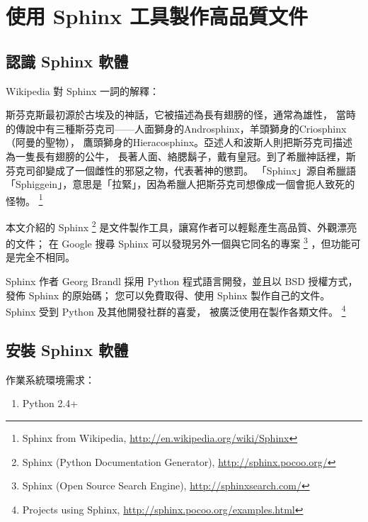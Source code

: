 \documentclass[a4paper,12pt,english]{sphinxmanual}
\begin{document}
\chapter{使用 Sphinx 工具製作高品質文件}
\label{sphinx:sphinx}\label{sphinx::doc}

\section{認識 Sphinx 軟體}
\label{sphinx_intro:sphinx}\label{sphinx_intro::doc}
Wikipedia 對 Sphinx 一詞的解釋：

\begin{DUlineblock}{0em}
\item[] 斯芬克斯最初源於古埃及的神話，它被描述為長有翅膀的怪，通常為雄性，
當時的傳說中有三種斯芬克司——人面獅身的Androsphinx，羊頭獅身的Criosphinx（阿曼的聖物），
鷹頭獅身的Hieracosphinx。亞述人和波斯人則把斯芬克司描述為一隻長有翅膀的公牛，
長著人面、絡腮鬍子，戴有皇冠。到了希臘神話裡，斯芬克司卻變成了一個雌性的邪惡之物，代表著神的懲罰。
「Sphinx」源自希臘語「Sphiggein」，意思是「拉緊」，因為希臘人把斯芬克司想像成一個會扼人致死的怪物。
\footnote{
Sphinx from Wikipedia, \href{http://en.wikipedia.org/wiki/Sphinx}{http://en.wikipedia.org/wiki/Sphinx}
}
\end{DUlineblock}

本文介紹的 Sphinx \footnote{
Sphinx (Python Documentation Generator), \href{http://sphinx.pocoo.org/}{http://sphinx.pocoo.org/}
} 是文件製作工具，讓寫作者可以輕鬆產生高品質、外觀漂亮的文件；
在 Google 搜尋 Sphinx 可以發現另外一個與它同名的專案 \footnote{
Sphinx (Open Source Search Engine), \href{http://sphinxsearch.com/}{http://sphinxsearch.com/}
} ，但功能可是完全不相同。

Sphinx 作者 Georg Brandl 採用 Python 程式語言開發，並且以 BSD 授權方式，發佈 Sphinx 的原始碼；
您可以免費取得、使用 Sphinx 製作自己的文件。 Sphinx 受到 Python 及其他開發社群的喜愛，
被廣泛使用在製作各類文件。 \footnote{
Projects using Sphinx, \href{http://sphinx.pocoo.org/examples.html}{http://sphinx.pocoo.org/examples.html}
}


\section{安裝 Sphinx 軟體}
\label{sphinx_install:sphinx}\label{sphinx_install::doc}
作業系統環境需求：
\begin{enumerate}
\item {} 
Python 2.4+

\end{enumerate}
\end{document}
